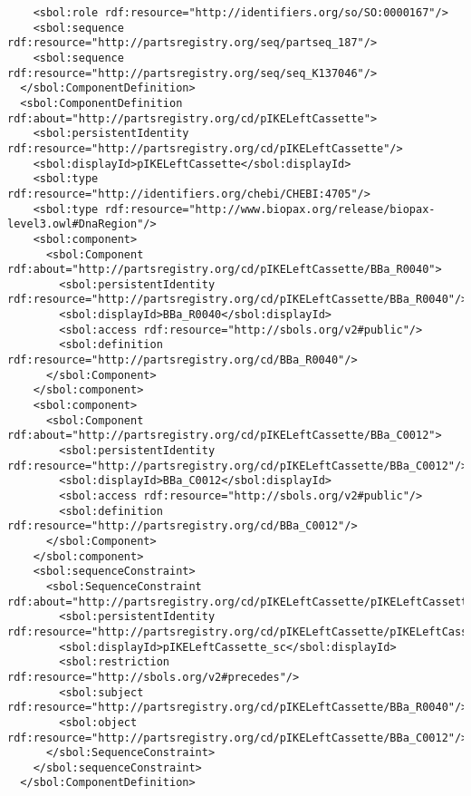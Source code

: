 \begin{minipage}{0.95\textwidth}
\begin{lstlisting}
    <sbol:role rdf:resource="http://identifiers.org/so/SO:0000167"/>
    <sbol:sequence rdf:resource="http://partsregistry.org/seq/partseq_187"/>
    <sbol:sequence rdf:resource="http://partsregistry.org/seq/seq_K137046"/>
  </sbol:ComponentDefinition>
  <sbol:ComponentDefinition rdf:about="http://partsregistry.org/cd/pIKELeftCassette">
    <sbol:persistentIdentity rdf:resource="http://partsregistry.org/cd/pIKELeftCassette"/>
    <sbol:displayId>pIKELeftCassette</sbol:displayId>
    <sbol:type rdf:resource="http://identifiers.org/chebi/CHEBI:4705"/>
    <sbol:type rdf:resource="http://www.biopax.org/release/biopax-level3.owl#DnaRegion"/>
    <sbol:component>
      <sbol:Component rdf:about="http://partsregistry.org/cd/pIKELeftCassette/BBa_R0040">
        <sbol:persistentIdentity rdf:resource="http://partsregistry.org/cd/pIKELeftCassette/BBa_R0040"/>
        <sbol:displayId>BBa_R0040</sbol:displayId>
        <sbol:access rdf:resource="http://sbols.org/v2#public"/>
        <sbol:definition rdf:resource="http://partsregistry.org/cd/BBa_R0040"/>
      </sbol:Component>
    </sbol:component>
    <sbol:component>
      <sbol:Component rdf:about="http://partsregistry.org/cd/pIKELeftCassette/BBa_C0012">
        <sbol:persistentIdentity rdf:resource="http://partsregistry.org/cd/pIKELeftCassette/BBa_C0012"/>
        <sbol:displayId>BBa_C0012</sbol:displayId>
        <sbol:access rdf:resource="http://sbols.org/v2#public"/>
        <sbol:definition rdf:resource="http://partsregistry.org/cd/BBa_C0012"/>
      </sbol:Component>
    </sbol:component>
    <sbol:sequenceConstraint>
      <sbol:SequenceConstraint rdf:about="http://partsregistry.org/cd/pIKELeftCassette/pIKELeftCassette_sc">
        <sbol:persistentIdentity rdf:resource="http://partsregistry.org/cd/pIKELeftCassette/pIKELeftCassette_sc"/>
        <sbol:displayId>pIKELeftCassette_sc</sbol:displayId>
        <sbol:restriction rdf:resource="http://sbols.org/v2#precedes"/>
        <sbol:subject rdf:resource="http://partsregistry.org/cd/pIKELeftCassette/BBa_R0040"/>
        <sbol:object rdf:resource="http://partsregistry.org/cd/pIKELeftCassette/BBa_C0012"/>
      </sbol:SequenceConstraint>
    </sbol:sequenceConstraint>
  </sbol:ComponentDefinition>
\end{lstlisting}
\end{minipage}

\clearpage

